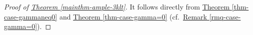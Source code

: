 


\begin{proof}[Proof of \texorpdfstring{{\hyperref[mainthm-ample-3klt]{Theorem \ref*{mainthm-ample-3klt}}}}{text}]
It follows directly from {\hyperref[thm-case-gammaneq0]{Theorem \ref*{thm-case-gammaneq0}}} and  {\hyperref[thm-case-gamma=0]{Theorem \ref*{thm-case-gamma=0}}} (cf.~{\hyperref[rmq-case-gamma=0]{Remark \ref*{rmq-case-gamma=0}}}).
\end{proof}










